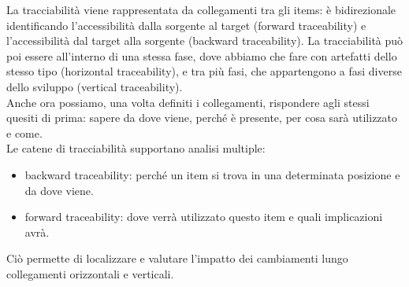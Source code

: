 La tracciabilità viene rappresentata da collegamenti tra gli items: è bidirezionale identificando l’accessibilità dalla sorgente al target (forward traceability) e l’accessibilità dal target alla sorgente (backward traceability). La tracciabilità può poi essere all’interno di una stessa fase, dove abbiamo che fare con artefatti dello stesso tipo (horizontal traceability), e tra più fasi, che appartengono a fasi diverse dello sviluppo (vertical traceability).\\
Anche ora possiamo, una volta definiti i collegamenti, rispondere agli stessi quesiti di prima: sapere da dove viene, perché è presente, per cosa sarà utilizzato e come.\\
Le catene di tracciabilità supportano analisi multiple: 
\begin{itemize}
    \item backward traceability: perché un item si trova in una determinata posizione e da dove viene.
    \item forward traceability: dove verrà utilizzato questo item e quali implicazioni avrà.
\end{itemize}
Ciò permette di localizzare e valutare l’impatto dei cambiamenti lungo collegamenti orizzontali e verticali.

